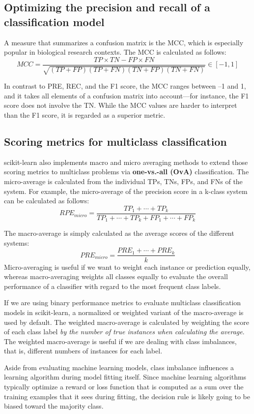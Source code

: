 \subsection{Optimizing the precision and recall of a classification model}
A measure that summarizes a confusion matrix is the MCC, which is especially popular in biological research contexts. The MCC is calculated as follows:
$$MCC=\frac{TP\times TN-FP\times FN}{\sqrt{(TP+FP)(TP+FN)(TN+FP)(TN+FN)}}\in [-1, 1]$$

In contrast to PRE, REC, and the F1 score, the MCC ranges between –1 and 1, and it takes all elements of a confusion matrix into account—for instance, the F1 score does not involve the TN. While the MCC values are harder to interpret than the F1 score, it is regarded as a superior metric.

\subsection{Scoring metrics for multiclass classification}
scikit-learn also implements macro and micro averaging methods to extend those scoring metrics
to multiclass problems via \textbf{one-vs.-all (OvA)} classification. The micro-average is calculated from the
individual TPs, TNs, FPs, and FNs of the system. For example, the micro-average of the precision score
in a k-class system can be calculated as follows:
$$RPE_{micro}=\frac{TP_1+\cdots+TP_k}{TP_1+\cdots+TP_k+FP_1+\cdots+FP_k}$$

The macro-average is simply calculated as the average scores of the different systems:
$$PRE_{micro}=\frac{PRE_1+\cdots+PRE_k}{k}$$
Micro-averaging is useful if we want to weight each instance or prediction equally, whereas macro-averaging weights all classes equally to evaluate the overall performance of a classifier with regard to the most frequent class labels.

If we are using binary performance metrics to evaluate multiclass classification models in scikit-learn, a normalized or weighted variant of the macro-average is used by default. The weighted macro-average is calculated by weighting the score of each class label \textit{by the number of true instances when calculating the average}. The weighted macro-average is useful if we are dealing with class imbalances, that is, different numbers of instances for each label.

Aside from evaluating machine learning models, class imbalance influences a learning algorithm during model fitting itself. Since machine learning algorithms typically optimize a reward or loss function that is computed as a sum over the training examples that it sees during fitting, the decision rule is likely going to be biased toward the majority class.

